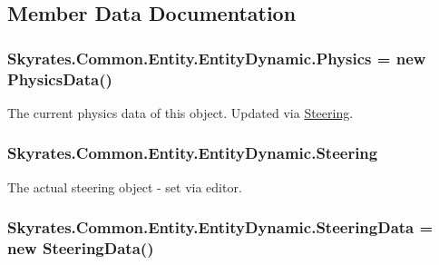 \subsection{Member Data Documentation}
\hypertarget{class_skyrates_1_1_common_1_1_entity_1_1_entity_dynamic_a2cc825f563606d4d565a4b0de1feab19}{
\subsubsection[{Physics}]{ Skyrates.\-Common.\-Entity.\-Entity\-Dynamic.\-Physics = new {\bf Physics\-Data}()}}\label{class_skyrates_1_1_common_1_1_entity_1_1_entity_dynamic_a2cc825f563606d4d565a4b0de1feab19}


The current physics data of this object. Updated via \hyperlink{class_skyrates_1_1_common_1_1_entity_1_1_entity_dynamic_a8d35984946a298623b4de895873de43b}{Steering}. 

\hypertarget{class_skyrates_1_1_common_1_1_entity_1_1_entity_dynamic_a8d35984946a298623b4de895873de43b}{
\subsubsection[{Steering}]{ Skyrates.\-Common.\-Entity.\-Entity\-Dynamic.\-Steering}}\label{class_skyrates_1_1_common_1_1_entity_1_1_entity_dynamic_a8d35984946a298623b4de895873de43b}


The actual steering object -\/ set via editor. 

\hypertarget{class_skyrates_1_1_common_1_1_entity_1_1_entity_dynamic_a60e4edbed3f02c3ba4a7c6150fbad90e}{
\subsubsection[{Steering\-Data}]{ Skyrates.\-Common.\-Entity.\-Entity\-Dynamic.\-Steering\-Data = new {\bf Steering\-Data}()}}\label{class_skyrates_1_1_common_1_1_entity_1_1_entity_dynamic_a60e4edbed3f02c3ba4a7c6150fbad90e}



